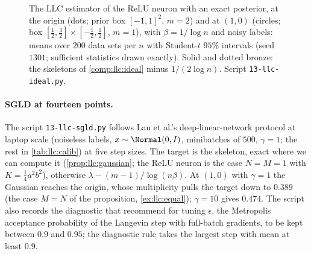 \begin{refsection}
\begin{figure}[t]
\centering
{}
\caption{The LLC estimator of the ReLU neuron with an exact posterior, at the origin (dots; prior box $[-1,1]^2$, $m=2$) and at $(1,0)$ (circles; box $[\tfrac12,\tfrac32]\times[-\tfrac12,\tfrac12]$, $m=1$), with $\beta=1/\log n$ and noisy labels: means over $200$ data sets per $n$ with Student-$t$ $95\%$ intervals (seed $1301$; sufficient statistics drawn exactly). Solid and dotted bronze: the skeletons of \cref{comp:llc:ideal} minus $1/(2\log n)$. Script \texttt{13-llc-ideal.py}.}\label{fig:llc:ideal}
\end{figure}

\paragraph{SGLD at fourteen points.} The script \texttt{13-llc-sgld.py} follows Lau et al.'s deep-linear-network protocol at laptop scale (noiseless labels, $x\sim\Normal(0,I)$, minibatches of $500$, $\gamma=1$; the rest in \cref{tab:llc:calib}) at five step sizes. The target is the skeleton, exact where we can compute it (\cref{prop:llc:gaussian}; the ReLU neuron is the case $N=M=1$ with $K=\tfrac14a^2b^2$), otherwise $\lambda-(m-1)/\log(n\beta)$. At $(1,0)$ with $\gamma=1$ the Gaussian reaches the origin, whose multiplicity pulls the target down to $0.389$ (the case $M=N$ of the proposition, \cref{ex:llc:equal}); $\gamma=10$ gives $0.474$. The script also records the diagnostic that \textcite{LauEtAl2025} recommend for tuning $\epsilon$, the Metropolis acceptance probability of the Langevin step with full-batch gradients, to be kept between $0.9$ and $0.95$; the diagnostic rule takes the largest step with mean at least $0.9$.


\end{refsection}
